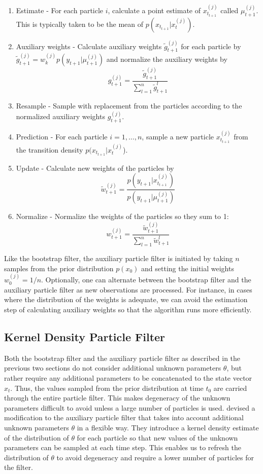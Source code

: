 \documentclass{article}
\begin{document}
\begin{enumerate}
\item Estimate - For each particle $i$, calculate a point estimate of $x_{t_{t+1}}^{(j)}$ called $\mu_{t+1}^{(j)}$.  This is typically taken to be the mean of $p(x_{t_{t+1}}|x_t^{(j)})$.
\item Auxiliary weights - Calculate auxiliary weights $\tilde{g}_{t+1}^{(j)}$ for each particle by $\tilde{g}_{t+1}^{(j)} = w_k^{(j)} p(y_{t+1}|\mu_{t+1}^{(j)})$ and normalize the auxiliary weights by \[g_{t+1}^{(j)} = \frac{\tilde{g}_{t+1}^{(j)}}{\sum_{l=1}^n \tilde{g}_{t+1}^l}\]
\item Resample - Sample with replacement from the particles according to the normalized auxiliary weights $g_{t+1}^{(j)}$.
\item Prediction - For each particle $i = {1,\ldots,n}$, sample a new particle $x_{t_{t+1}}^{(j)}$ from the transition density $p(x_{t_{t+1}}|x_t^{(j)}$).
\item Update - Calculate new weights of the particles by \[\tilde{w}_{t+1}^{(j)} = \frac{p(y_{t+1}|x_{t_{t+1}}^{(j)})}{p(y_{t+1}|\mu_{t+1}^{(j)})}\]
\item Normalize - Normalize the weights of the particles so they sum to 1: \[w_{t+1}^{(j)} = \frac{\tilde{w}_{t+1}^{(j)}}{\sum_{l=1}^n \tilde{w}_{t+1}^l}\]
\end{enumerate}

\noindent Like the bootstrap filter, the auxiliary particle filter is initiated by taking $n$ samples from the prior distribution $p(x_0)$ and setting the initial weights $w_0^{(j)} = 1/n$.  Optionally, one can alternate between the bootstrap filter and the auxiliary particle filter as new observations are processed.  For instance, in cases where the distribution of the weights is adequate, we can avoid the estimation step of calculating auxiliary weights so that the algorithm runs more efficiently.

\subsection{Kernel Density Particle Filter}

Both the bootstrap filter and the auxiliary particle filter as described in the previous two sections do not consider additional unknown parameters $\theta$, but rather require any additional parameters to be concatenated to the state vector $x_t$.  Thus, the values sampled from the prior distribution at time $t_0$ are carried through the entire particle filter.  This makes degeneracy of the unknown parameters difficult to avoid unless a large number of particles is used.  \citet{Liu:West:comb:2001} devised a modification to the auxiliary particle filter that takes into account additional unknown parameters $\theta$ in a flexible way.  They introduce a kernel density estimate of the distribution of $\theta$ for each particle so that new values of the unknown parameters can be sampled at each time step.  This enables us to refresh the distribution of $\theta$ to avoid degeneracy and require a lower number of particles for the filter.
\end{document}
